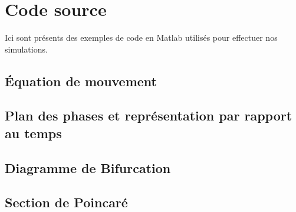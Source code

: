 \newpage
\section{Code source}
Ici sont présents des exemples de code en Matlab utilisés pour effectuer nos simulations.
\subsection{Équation de mouvement}

\subsection{Plan des phases et représentation par rapport au temps}
\newpage
\subsection{Diagramme de Bifurcation}

\subsection{Section de Poincaré}
